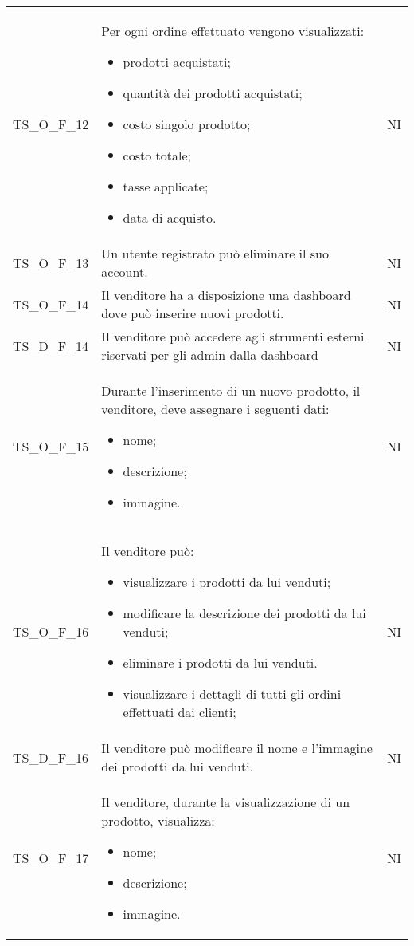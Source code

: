{\begin{longtable}{C{3cm} C{10.2cm} C{1.5cm}}
TS\_O\_F\_12 & Per ogni ordine effettuato vengono visualizzati:
\begin{itemize}
	\item prodotti acquistati;
	\item quantità dei prodotti acquistati;
	\item costo singolo prodotto;
	\item costo totale;
	\item tasse applicate;
	\item data di acquisto.
\end{itemize}
& NI\\

TS\_O\_F\_13 & Un utente registrato può eliminare il suo account. & NI\\

TS\_O\_F\_14 & Il venditore ha a disposizione una dashboard dove può inserire nuovi prodotti. & NI\\

TS\_D\_F\_14 & Il venditore può accedere agli strumenti esterni riservati per gli admin dalla dashboard & NI\\

TS\_O\_F\_15 & Durante l'inserimento di un nuovo prodotto, il venditore, deve assegnare i seguenti dati:
\begin{itemize}
	\item nome;
	\item descrizione;
	\item immagine.
\end{itemize} & NI\\

TS\_O\_F\_16 & Il venditore può:
\begin{itemize}
	\item visualizzare i prodotti da lui venduti;
	\item modificare la descrizione dei prodotti da lui venduti;
	\item eliminare i prodotti da lui venduti.
	\item visualizzare i dettagli di tutti gli ordini effettuati dai clienti;
\end{itemize} & NI\\

TS\_D\_F\_16 & Il venditore può modificare il nome e l'immagine dei prodotti da lui venduti. & NI\\

TS\_O\_F\_17 & Il venditore, durante la visualizzazione di un prodotto, visualizza:
\begin{itemize}
	\item nome;
	\item descrizione;
	\item immagine.
\end{itemize} & NI\\


\end{longtable}}
